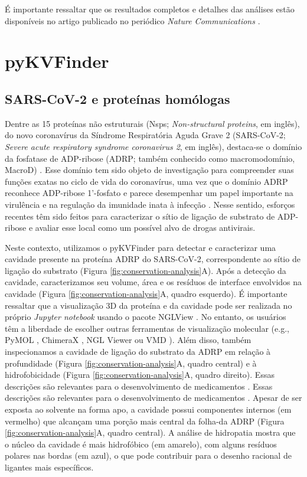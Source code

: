 \documentclass[Portugues]{phdquali}
\def\eg{e.g.\onedot}
\begin{document}
É importante ressaltar que os resultados completos e detalhes das análises estão disponíveis no artigo publicado no periódico \textit{Nature Communications} \cite{ribeiro2021}.

\section{pyKVFinder \label{ap:casos-de-estudo-pykvfinder}}

\subsection{SARS-CoV-2 e proteínas homólogas}

Dentre as 15 proteínas não estruturais (Nsps; \textit{Non-structural proteins}, em inglês), do novo coronavírus da Síndrome Respiratória Aguda Grave 2 (SARS-CoV-2; \textit{Severe acute respiratory syndrome coronavirus 2}, em inglês), destaca-se o domínio da fosfatase de ADP-ribose (ADRP; também conhecido como macromodomínio, MacroD) \cite{michalska2020}. Esse domínio tem sido objeto de investigação para compreender suas funções exatas no ciclo de vida do coronavírus, uma vez que o domínio ADRP reconhece ADP-ribose 1'-fosfato e parece desempenhar um papel importante na virulência e na regulação da imunidade inata à infecção \cite{fehr2016,claverie2020}. Nesse sentido, esforços recentes têm sido feitos para caracterizar o sítio de ligação de substrato de ADP-ribose e avaliar esse local como um possível alvo de drogas antivirais.

Neste contexto, utilizamos o pyKVFinder para detectar e caracterizar uma cavidade presente na proteína ADRP do SARS-CoV-2, correspondente ao sítio de ligação do substrato (Figura \ref{fig:conservation-analysis}A). Após a detecção da cavidade, caracterizamos seu volume, área e os resíduos de interface envolvidos na cavidade (Figura \ref{fig:conservation-analysis}A, quadro esquerdo). É importante ressaltar que a visualização 3D da proteína e da cavidade pode ser realizada no próprio \textit{Jupyter notebook} usando o pacote NGLView \cite{nglview}. No entanto, os usuários têm a liberdade de escolher outras ferramentas de visualização molecular (\eg, PyMOL \cite{pymol}, ChimeraX \cite{chimerax}, NGL Viewer \cite{nglviewer} ou VMD \cite{vmd}). Além disso, também inspecionamos a cavidade de ligação do substrato da ADRP em relação à profundidade (Figura \ref{fig:conservation-analysis}A, quadro central) e à hidrofobicidade (Figura \ref{fig:conservation-analysis}A, quadro direito). Essas descrições são relevantes para o desenvolvimento de medicamentos \cite{brosey2021}. Essas descrições são relevantes para o desenvolvimento de medicamentos \cite{brosey2021}. Apesar de ser exposta ao solvente na forma apo, a cavidade possui componentes internos (em vermelho) que alcançam uma porção mais central da folha-\textbeta\space da ADRP (Figura \ref{fig:conservation-analysis}A, quadro central). A análise de hidropatia mostra que o núcleo da cavidade é mais hidrofóbico (em amarelo), com alguns resíduos polares nas bordas (em azul), o que pode contribuir para o desenho racional de ligantes mais específicos.
\end{document}
